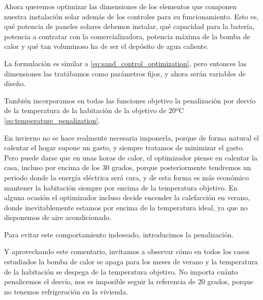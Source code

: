 Ahora queremos optimizar las dimensiones de los elementos que componen nuestra
instalación solar además de los controles para su funcionamiento. Esto es, qué
potencia de paneles solares debemos instalar, qué capacidad para la batería,
potencia a contratar con la comercializadora, potencia máxima de la bomba de
calor y qué tan voluminoso ha de ser el depósito de agua caliente.

La formulación es similar a \eqref{eq:sand_control_optimization}, pero entonces
las dimensiones las tratábamos como parámetros fijos, y ahora serán variables
de diseño.

También incorporamos en todas las funciones objetivo la penalización por desvío
de la temperatura de la habitación de la objetivo de 20ºC
\eqref{eq:temperature_penalization}.

En invierno no se hace realmente necesaria imponerla, porque de forma natural
el calentar el hogar supone un gasto, y siempre tratamos de minimizar el gasto.
Pero puede darse que en unas horas de calor, el optimizador piense en calentar
la casa, incluso por encima de los 30 grados, porque posteriormente tendremos
un periodo donde la energía eléctrica será cara, y de esta forma es más
económico mantener la habitación siempre por encima de la temperatura objetivo.
En alguna ocasión el optimizador incluso decide encender la calefacción en
verano, donde inevitablemente estamos por encima de la temperatura ideal, ya
que no disponemos de aire acondicionado.

Para evitar este comportamiento indeseado, introducimos la penalización.

Y aprovechando este comentario, invitamos a observar cómo en todos los casos
estudiados la bomba de calor se apaga para los meses de verano y la temperatura
de la habitación se despega de la temperatura objetivo. No importa cuánto
penalicemos el desvío, nos es imposible seguir la referencia de 20 grados,
porque no tenemos refrigeración en la vivienda.

